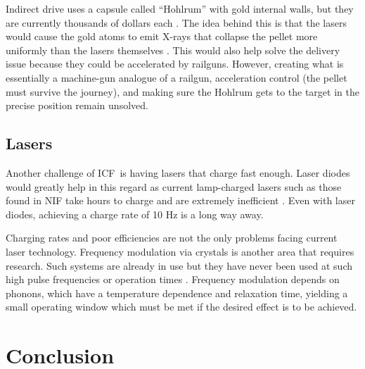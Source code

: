 \documentclass[12pt, a4paper]{article}
\newcommand{\ic}{ICF}
\begin{document}
			Indirect drive uses a capsule called ``Hohlrum'' with gold internal walls, but they are currently thousands of dollars each \cite{icfd1}. The idea behind this is that the lasers would cause the gold atoms to emit X-rays that collapse the pellet more uniformly than the lasers themselves \cite{icfd2}. This would also help solve the delivery issue because they could be accelerated by railguns. However, creating what is essentially a machine-gun analogue of a railgun, acceleration control (the pellet must survive the journey), and making sure the Hohlrum gets to the target in the precise position remain unsolved.
		\subsection{Lasers}
			Another challenge of \ic~is having lasers that charge fast enough. Laser diodes would greatly help in this regard as current lamp-charged lasers such as those found in NIF take hours to charge and are extremely inefficient \cite{laser1}. Even with laser diodes, achieving a charge rate of 10 Hz is a long way away.
			
			Charging rates and poor efficiencies are not the only problems facing current laser technology. Frequency modulation via crystals is another area that requires research. Such systems are already in use but they have never been used at such high pulse frequencies or operation times \cite{laser2}. Frequency modulation depends on phonons, which have a temperature dependence and relaxation time, yielding a small operating window which must be met if the desired effect is to be achieved.
	\section{Conclusion}
	
	
\end{document}
